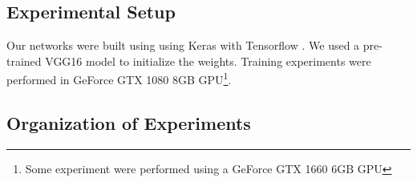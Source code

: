% 
% 
%  
%  
%  
%  

\subsection{Experimental Setup}
\label{cap5_experimental_setup}

Our networks were built using using Keras \cite{chollet2015keras} with Tensorflow \cite{tensorflow2015-whitepaper}. 
We used a pre-trained VGG16 model to initialize the weights. 
Training experiments were performed in GeForce GTX 1080 8GB GPU\footnote{Some experiment were performed using a GeForce GTX 1660 6GB GPU}.


\subsection{Organization of Experiments}
\label{cap6_organiz_experimentos}

